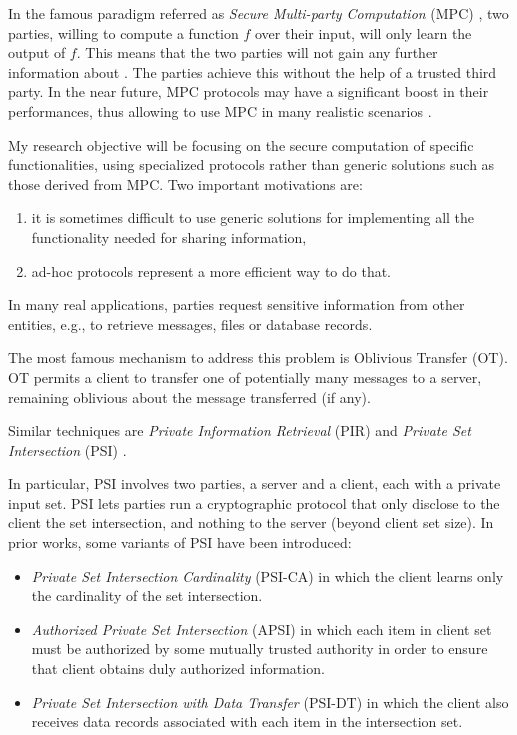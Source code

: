 \documentclass[dvips,12pt]{article}
\begin{document}
In the famous paradigm referred as \emph{Secure Multi-party Computation} (MPC) \cite{Yao}, two parties, willing to compute a function $f$ over their input, will only learn the output of $f$. This means that the two parties will not gain any further information about . 
The parties achieve this without the help of a trusted third party.
In the near future, MPC protocols may have a significant boost in their performances, thus allowing to use MPC in many realistic scenarios \cite{orlandi2011multiparty}.

My research objective will be focusing on the secure computation of specific functionalities, using specialized protocols rather than generic solutions such as those derived from MPC.
Two important motivations are:
\begin{enumerate}
\item it is sometimes difficult to use generic solutions for implementing all the functionality needed for sharing information,
\item ad-hoc protocols represent a more efficient way to do that.
\end{enumerate} 

In many real applications, parties request sensitive information from other entities, e.g., to retrieve messages, files or database records. 

The most famous mechanism to address this problem is Oblivious Transfer (OT)\cite{oblivious}.
OT permits a client to transfer one of potentially many messages to a server, remaining oblivious about the message transferred (if any).

Similar techniques are \emph{Private Information Retrieval} (PIR) \cite{pir} and \emph{Private Set Intersection} (PSI) \cite{psi}. 

In particular, PSI involves two parties, a server and a client, each with a private input set. PSI
lets parties run a cryptographic protocol that only disclose to the client the set intersection, and
nothing to the server (beyond client set size).
In prior works, some variants of PSI have been introduced:
\begin{itemize}
\item \emph{Private Set Intersection Cardinality} (PSI-CA) in which the client learns only the cardinality of the set intersection.
\item \emph{Authorized Private Set Intersection} (APSI) in which each item in client set must be authorized by some mutually trusted authority in order to ensure that client obtains duly authorized information.
\item \emph{Private Set Intersection with Data Transfer} (PSI-DT) in which the client also receives data records associated with each item in the intersection set.
\end{itemize}
\end{document}
